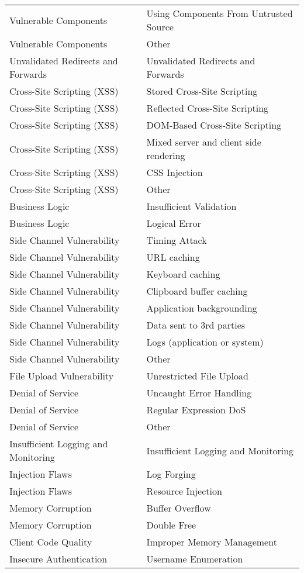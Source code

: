 \begin{longtable}{p{} | p{} }
Vulnerable Components& Using Components From Untrusted Source\\
Vulnerable Components& Other\\
Unvalidated Redirects and Forwards& Unvalidated Redirects and Forwards\\
Cross-Site Scripting (XSS)& Stored Cross-Site Scripting\\
Cross-Site Scripting (XSS)& Reflected Cross-Site Scripting\\
Cross-Site Scripting (XSS)& DOM-Based Cross-Site Scripting\\
Cross-Site Scripting (XSS)& Mixed server and client side rendering\\
Cross-Site Scripting (XSS)& CSS Injection\\
Cross-Site Scripting (XSS)& Other\\
Business Logic& Insufficient Validation\\
Business Logic& Logical Error\\
Side Channel Vulnerability& Timing Attack\\
Side Channel Vulnerability& URL caching\\
Side Channel Vulnerability& Keyboard caching\\
Side Channel Vulnerability& Clipboard buffer caching\\
Side Channel Vulnerability& Application backgrounding\\
Side Channel Vulnerability& Data sent to 3rd parties \\
Side Channel Vulnerability& Logs (application or system)\\
Side Channel Vulnerability& Other\\
File Upload Vulnerability& Unrestricted File Upload\\
Denial of Service& Uncaught Error Handling\\
Denial of Service& Regular Expression DoS\\
Denial of Service& Other\\
Insufficient Logging and Monitoring& Insufficient Logging and Monitoring\\
Injection Flaws& Log Forging\\
Injection Flaws& Resource Injection\\
Memory Corruption& Buffer Overflow\\
Memory Corruption& Double Free\\
Client Code Quality& Improper Memory Management\\
Insecure Authentication& Username Enumeration\\

\end{longtable}
